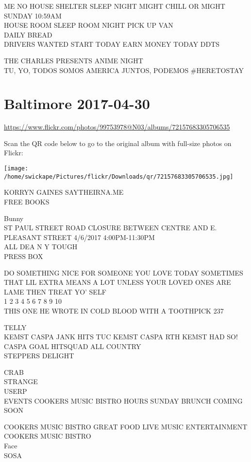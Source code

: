 \documentclass[10pt,letterpaper]{article}
\begin{document}
ME NO HOUSE SHELTER SLEEP NIGHT MIGHT CHILL OR MIGHT SUNDAY 10:59AM\\
HOUSE ROOM SLEEP ROOM NIGHT PICK UP VAN\\
DAILY BREAD\\
DRIVERS WANTED START TODAY EARN MONEY TODAY DDTS

THE CHARLES PRESENTS ANIME NIGHT\\
TU, YO, TODOS SOMOS AMERICA JUNTOS, PODEMOS \#HERETOSTAY
\pagebreak

\section*{Baltimore 2017-04-30}

\url{https://www.flickr.com/photos/99753978@N03/albums/72157683305706535}

Scan the QR code below to go to the original album with full-size photos on Flickr:

\texttt{[image: /home/swickape/Pictures/flickr/Downloads/qr/72157683305706535.jpg]}
\pagebreak

KORRYN GAINES SAYTHEIRNA.ME\\
FREE BOOKS

Bunny\\
ST PAUL STREET ROAD CLOSURE BETWEEN CENTRE AND E. PLEASANT STREET 4/6/2017 4:00PM{-}11:30PM\\
ALL DEA N Y TOUGH\\
PRESS BOX

DO SOMETHING NICE FOR SOMEONE YOU LOVE TODAY SOMETIMES THAT LIL EXTRA MEANS A LOT UNLESS YOUR LOVED ONES ARE LAME THEN TREAT YO' SELF\\
1 2 3 4 5 6 7 8 9 10\\
THIS ONE HE WROTE IN COLD BLOOD WITH A TOOTHPICK 237

TELLY\\
KEMST CASPA JANK HITS TUC KEMST CASPA RTH KEMST HAD SO!  CASPA GOAL HITSQUAD ALL COUNTRY\\
STEPPERS DELIGHT

CRAB\\
STRANGE\\
USERP\\
EVENTS COOKERS MUSIC BISTRO HOURS SUNDAY BRUNCH COMING SOON

COOKERS MUSIC BISTRO GREAT FOOD LIVE MUSIC ENTERTAINMENT\\
COOKERS MUSIC BISTRO\\
Face\\
SOSA
\end{document}
